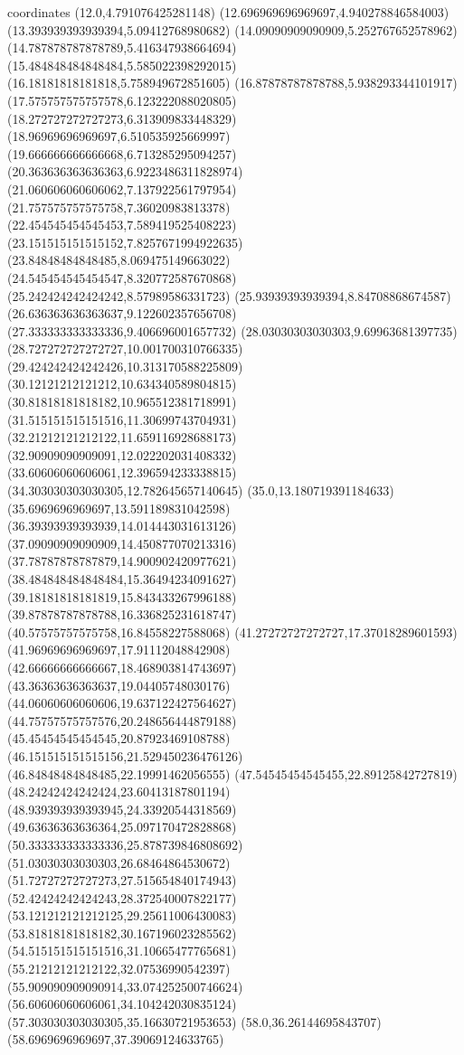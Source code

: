 coordinates {%
(12.0,4.791076425281148)
(12.696969696969697,4.940278846584003)
(13.393939393939394,5.09412768980682)
(14.09090909090909,5.252767652578962)
(14.787878787878789,5.416347938664694)
(15.484848484848484,5.585022398292015)
(16.18181818181818,5.758949672851605)
(16.87878787878788,5.938293344101917)
(17.575757575757578,6.123222088020805)
(18.272727272727273,6.313909833448329)
(18.96969696969697,6.510535925669997)
(19.666666666666668,6.713285295094257)
(20.363636363636363,6.9223486311828974)
(21.060606060606062,7.137922561797954)
(21.757575757575758,7.36020983813378)
(22.454545454545453,7.589419525408223)
(23.151515151515152,7.8257671994922635)
(23.84848484848485,8.069475149663022)
(24.545454545454547,8.320772587670868)
(25.242424242424242,8.57989586331723)
(25.93939393939394,8.84708868674587)
(26.636363636363637,9.122602357656708)
(27.333333333333336,9.406696001657732)
(28.03030303030303,9.69963681397735)
(28.727272727272727,10.001700310766335)
(29.424242424242426,10.313170588225809)
(30.12121212121212,10.634340589804815)
(30.81818181818182,10.965512381718991)
(31.515151515151516,11.30699743704931)
(32.21212121212122,11.659116928688173)
(32.90909090909091,12.022202031408332)
(33.60606060606061,12.396594233338815)
(34.303030303030305,12.782645657140645)
(35.0,13.180719391184633)
(35.6969696969697,13.591189831042598)
(36.39393939393939,14.014443031613126)
(37.09090909090909,14.450877070213316)
(37.78787878787879,14.900902420977621)
(38.484848484848484,15.36494234091627)
(39.18181818181819,15.843433267996188)
(39.87878787878788,16.336825231618747)
(40.57575757575758,16.84558227588068)
(41.27272727272727,17.37018289601593)
(41.96969696969697,17.91112048842908)
(42.66666666666667,18.468903814743697)
(43.36363636363637,19.04405748030176)
(44.06060606060606,19.637122427564627)
(44.75757575757576,20.248656444879188)
(45.45454545454545,20.87923469108788)
(46.151515151515156,21.529450236476126)
(46.84848484848485,22.19991462056555)
(47.54545454545455,22.89125842727819)
(48.24242424242424,23.60413187801194)
(48.939393939393945,24.33920544318569)
(49.63636363636364,25.097170472828868)
(50.333333333333336,25.878739846808692)
(51.03030303030303,26.68464864530672)
(51.72727272727273,27.515654840174943)
(52.42424242424243,28.372540007822177)
(53.121212121212125,29.25611006430083)
(53.81818181818182,30.167196023285562)
(54.515151515151516,31.10665477765681)
(55.21212121212122,32.07536990542397)
(55.909090909090914,33.074252500746624)
(56.60606060606061,34.104242030835124)
(57.303030303030305,35.16630721953653)
(58.0,36.26144695843707)
(58.6969696969697,37.39069124633765)
}
